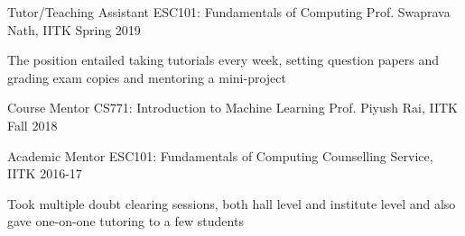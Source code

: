 
\cventry
	{Tutor/Teaching Assistant}
	{ESC101: Fundamentals of Computing}
	{Prof. Swaprava Nath, IITK}
	{Spring 2019}
	{
		\begin{cvitems}
		\item The position entailed taking tutorials every week, setting question papers and grading exam copies and mentoring a mini-project
		\end{cvitems}
	}

\cventry
	{Course Mentor}
	{CS771: Introduction to Machine Learning}
	{Prof. Piyush Rai, IITK}
	{Fall 2018}
	{}

\cventry
	{Academic Mentor}
	{ESC101: Fundamentals of Computing}
	{Counselling Service, IITK}
	{2016-17}
	{
		\begin{cvitems}
		\item Took multiple doubt clearing sessions, both hall level and institute level and also gave one-on-one tutoring to a few students
		\end{cvitems}
	}

